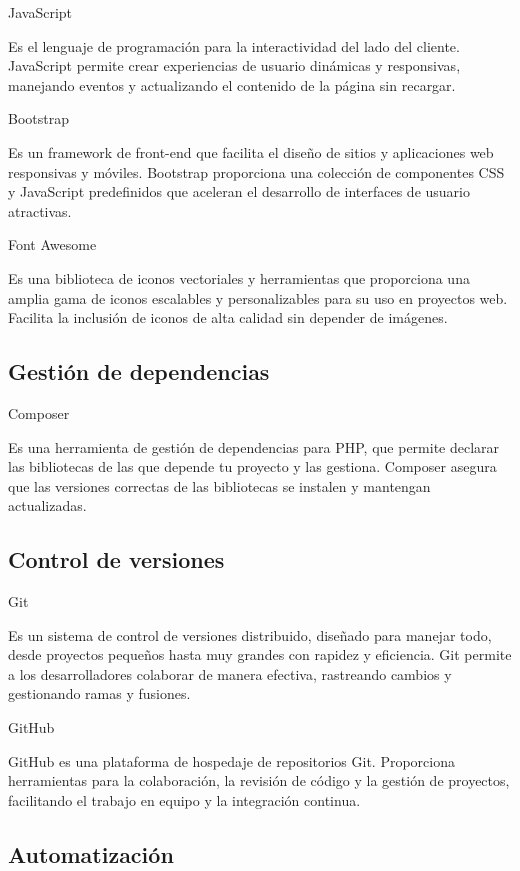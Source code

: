 JavaScript

Es el lenguaje de programación para la interactividad del lado del cliente.
JavaScript permite crear experiencias de usuario dinámicas y responsivas, manejando eventos y actualizando el contenido
de la página sin recargar.

Bootstrap

Es un framework de front-end que facilita el diseño de sitios y aplicaciones web
responsivas y móviles.
Bootstrap proporciona una colección de componentes CSS
y JavaScript predefinidos que aceleran el desarrollo de interfaces de usuario atractivas.

Font Awesome

Es una biblioteca de iconos vectoriales y herramientas que proporciona una amplia gama de
iconos escalables y personalizables para su uso en proyectos web.
Facilita la inclusión de iconos de alta calidad sin depender de imágenes.

\subsection*{Gestión de dependencias}

Composer

Es una herramienta de gestión de dependencias para PHP, que
permite declarar las bibliotecas de las que depende tu proyecto
y las gestiona.
Composer asegura que las versiones correctas de las bibliotecas se instalen y mantengan actualizadas.

\subsection*{Control de versiones}

Git

Es un sistema de control de versiones distribuido, diseñado para manejar todo, desde proyectos
pequeños hasta muy grandes con rapidez y eficiencia.
Git permite a los desarrolladores colaborar de manera efectiva, rastreando cambios y gestionando ramas y fusiones.


GitHub

GitHub es una plataforma de hospedaje de repositorios Git.
Proporciona herramientas para la colaboración, la revisión de código y la gestión de proyectos, facilitando el trabajo
en equipo y la integración continua.

\subsection*{Automatización}

